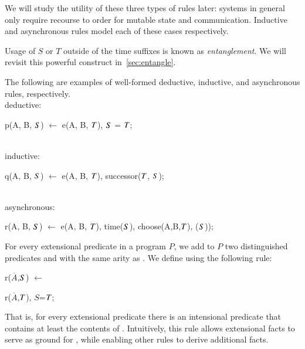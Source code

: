 We will study the utility of these three types of rules later: systems in
general only require recourse to order for mutable state and communication.
Inductive and asynchronous rules model each of these cases respectively.

Usage of $S$ or $T$ outside of the time suffixes is known as {\em
entanglement}.  We will revisit this powerful construct in~\ref{sec:entangle}. 

\begin{example}
The following are examples of well-formed deductive, inductive, and asynchronous rules, respectively.
\\
deductive:
\begin{Dedalus}
p(A, B, \(\DS\)) \(\leftarrow\) e(A, B, \(\DT\)), \(\DS\) = \(\DT\);
\end{Dedalus}
\\
inductive:
\begin{Dedalus}
q(A, B, \(\DS\)) \(\leftarrow\) e(A, B, \(\DT\)), successor(\(\DT\), \(\DS\));
\end{Dedalus}
\\
asynchronous:
\begin{Dedalus}
r(A, B, \(\DS\)) \(\leftarrow\) e(A, B, \(\DT\)), time(\(\DS\)),
   choose(A,B,\(\DT\)), (\(\DS\)));
\end{Dedalus}
\end{example}

For every extensional predicate  in a \lang program $P$, we add to
$P$ two distinguished predicates  and  with the same arity
as .  We define  using the following rule:

\begin{dedalus}
r\pos($\overline{A}$,\(\DS\)) \(\leftarrow\)
\end{dedalus}

\hspace{5mm}
\begin{dedalus}
   r($\overline{A}$,\(\DT\)), \(S\)=\(\DT\);
\end{dedalus}

That is, for every extensional predicate  there is an intensional
predicate  that contains at least the contents of .
Intuitively, this rule allows extensional facts to serve as ground for
, while enabling other rules to derive additional  facts.

